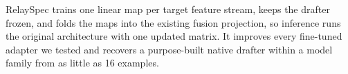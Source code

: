 RelaySpec trains one linear map per target feature stream, keeps the drafter frozen, and folds the maps into the existing fusion projection, so inference runs the original architecture with one updated matrix. It improves every fine-tuned adapter we tested and recovers a purpose-built native drafter within a model family from as little as 16 examples.
